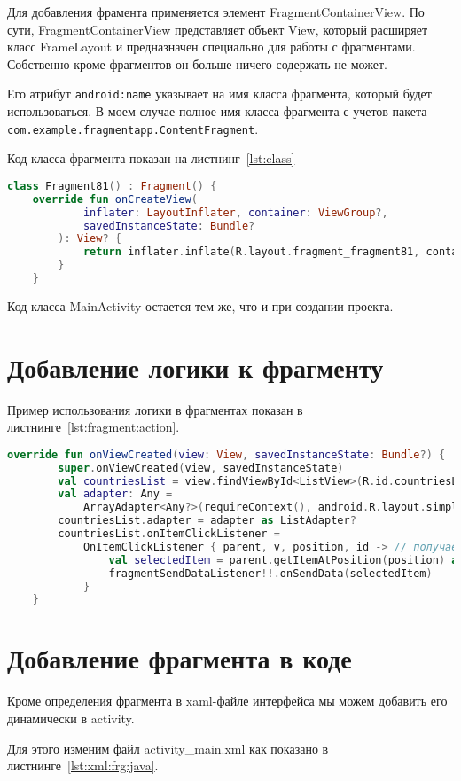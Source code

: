 Для добавления фрамента применяется элемент FragmentContainerView. По
сути, FragmentContainerView представляет объект View, который расширяет
класс FrameLayout и предназначен специально для работы с фрагментами.
Собственно кроме фрагментов он больше ничего содержать не может.\par
Его атрибут \texttt{android:name} указывает на имя класса фрагмента, который
будет использоваться. В моем случае полное имя класса фрагмента с учетов
пакета \texttt{com.example.fragmentapp.ContentFragment}.\par
Код класса фрагмента показан на листнинг~\ref{lst:class}

\begin{lstlisting}[language=Kotlin, caption=\leftline{}, label={lst:class}]
	class Fragment81() : Fragment() {
	override fun onCreateView(
			inflater: LayoutInflater, container: ViewGroup?,
			savedInstanceState: Bundle?
		): View? {
			return inflater.inflate(R.layout.fragment_fragment81, container, false)
		}
	}
\end{lstlisting}

Код класса MainActivity остается тем же, что и при создании проекта.

\section{Добавление логики к фрагменту}
Пример использования логики в фрагментах показан
в листнинге~\ref{lst:fragment:action}.
\begin{lstlisting}[language=Kotlin, caption=\leftline{}, label={lst:fragment:action}]
override fun onViewCreated(view: View, savedInstanceState: Bundle?) {
        super.onViewCreated(view, savedInstanceState)
        val countriesList = view.findViewById<ListView>(R.id.countriesList)
        val adapter: Any =
            ArrayAdapter<Any?>(requireContext(), android.R.layout.simple_list_item_1, countries)
        countriesList.adapter = adapter as ListAdapter?
        countriesList.onItemClickListener =
            OnItemClickListener { parent, v, position, id -> // получаем выбранный элемент
                val selectedItem = parent.getItemAtPosition(position) as String
                fragmentSendDataListener!!.onSendData(selectedItem)
            }
    }
\end{lstlisting}

\section{Добавление фрагмента в коде}
Кроме определения фрагмента в xaml-файле интерфейса мы можем добавить
его динамически в activity.\par
Для этого изменим файл activity\_main.xml как показано в
листнинге~\ref{lst:xml:frg:java}.

